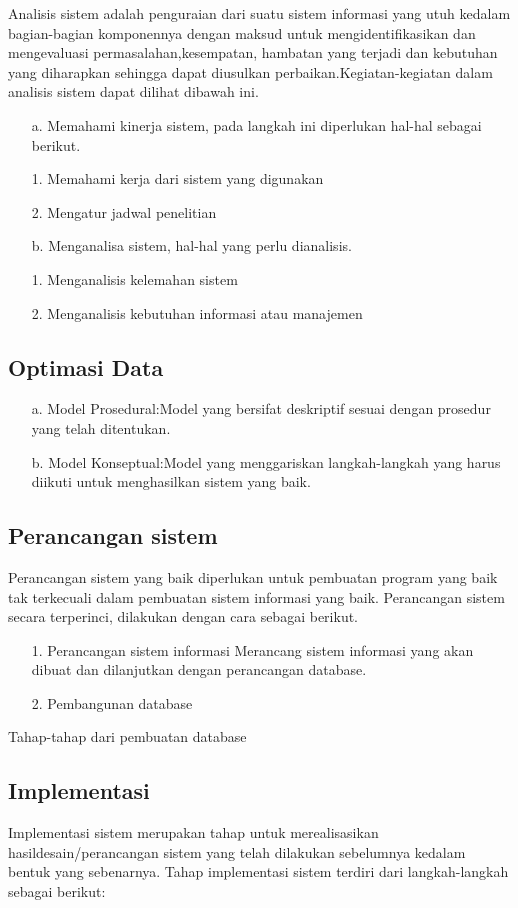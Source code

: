 \documentclass{jtetiproposalskripsi}
\begin{document}
Analisis sistem adalah penguraian dari suatu sistem informasi yang utuh kedalam bagian-bagian komponennya dengan maksud untuk mengidentifikasikan dan mengevaluasi permasalahan,kesempatan, hambatan yang terjadi dan kebutuhan yang diharapkan sehingga dapat diusulkan perbaikan.Kegiatan-kegiatan dalam analisis sistem dapat dilihat dibawah ini.
\begin{itemize}
\item[a.]Memahami kinerja sistem, pada langkah ini diperlukan hal-hal sebagai berikut.
\item[1.]Memahami kerja dari sistem yang digunakan
\item[2.]Mengatur jadwal penelitian
\item[b.]Menganalisa sistem, hal-hal yang perlu dianalisis.
\item[1.]Menganalisis kelemahan sistem
\item[2.]Menganalisis kebutuhan informasi atau manajemen
\end{itemize}
\subsection{Optimasi Data}
\begin{itemize}
\item[a.] Model Prosedural:Model yang bersifat deskriptif sesuai dengan prosedur yang telah ditentukan.
\item[b.] Model Konseptual:Model yang menggariskan langkah-langkah yang harus diikuti untuk menghasilkan 			  sistem yang baik.
\end{itemize}

\subsection{Perancangan sistem} 
Perancangan sistem yang baik diperlukan untuk pembuatan program yang baik tak terkecuali dalam pembuatan sistem informasi yang baik. Perancangan sistem secara terperinci, dilakukan dengan cara sebagai berikut.
\begin{itemize}
\item[1.]Perancangan sistem informasi
		 Merancang sistem informasi yang akan dibuat dan dilanjutkan dengan perancangan database.
\item[2.]Pembangunan database
\end{itemize}

Tahap-tahap dari pembuatan database
\subsection{Implementasi}
Implementasi sistem merupakan tahap untuk merealisasikan hasildesain/perancangan sistem yang telah dilakukan sebelumnya kedalam bentuk yang sebenarnya. Tahap implementasi sistem terdiri dari langkah-langkah sebagai berikut:
\end{document}
